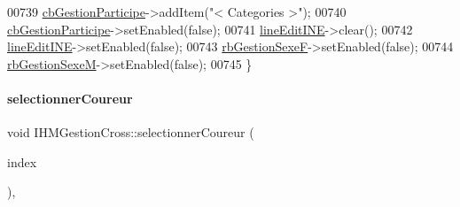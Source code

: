 \begin{DoxyCode}
00739     \hyperlink{class_i_h_m_gestion_cross_a89aff3b1c5d5198dd7aaecd932331e0d}{cbGestionParticipe}->addItem(\textcolor{stringliteral}{"< Categories >"});
00740     \hyperlink{class_i_h_m_gestion_cross_a89aff3b1c5d5198dd7aaecd932331e0d}{cbGestionParticipe}->setEnabled(\textcolor{keyword}{false});
00741     \hyperlink{class_i_h_m_gestion_cross_ab6c32fd079f81c4fa0b9ec0b4ef9bb61}{lineEditINE}->clear();
00742     \hyperlink{class_i_h_m_gestion_cross_ab6c32fd079f81c4fa0b9ec0b4ef9bb61}{lineEditINE}->setEnabled(\textcolor{keyword}{false});
00743     \hyperlink{class_i_h_m_gestion_cross_a4474ef47310eb3511befdf1beaa18b56}{rbGestionSexeF}->setEnabled(\textcolor{keyword}{false});
00744     \hyperlink{class_i_h_m_gestion_cross_a7d471a7f96862dcd302f7f8cc52dfea4}{rbGestionSexeM}->setEnabled(\textcolor{keyword}{false});
00745 \}
\end{DoxyCode}
\mbox{\label{class_i_h_m_gestion_cross_ad71963d500fd61995fdae94e833db163}} 
\paragraph{\texorpdfstring{selectionner\+Coureur}{selectionnerCoureur}}
{\footnotesize\ttfamily void I\+H\+M\+Gestion\+Cross\+::selectionner\+Coureur (\begin{DoxyParamCaption}\item[{Q\+Model\+Index}]{index }\end{DoxyParamCaption})\hspace{0.3cm}{\ttfamily [private]}, {\ttfamily [slot]}}



